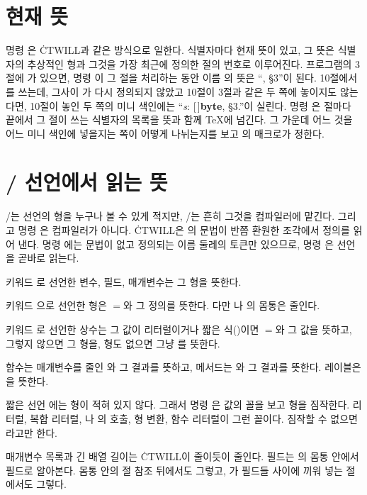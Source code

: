 \section{현재 뜻}
명령 은 \.{CTWILL}과 같은 방식으로 일한다. 식별자마다 현재 뜻이 있고,
그 뜻은 식별자의 추상적인 형과 그것을 가장 최근에 정의한 절의 번호로 이루어진다.
프로그램의 3절에 가 있으면, 명령 이 그 절을 처리하는
동안 이름 의 뜻은 ``, \S3''이 된다. 10절에서 를 쓰는데,
그사이 가 다시 정의되지 않았고 10절이 3절과 같은 두 쪽에 놓이지도 않는다면,
10절이 놓인 두 쪽의 미니 색인에는 ``{\it s\/}: [\,]{\bf byte}, \S3.''이 실린다.
명령 은 절마다 끝에서 그 절이 쓰는 식별자의 목록을 뜻과 함께 \TeX{}에
넘긴다. 그 가운데 어느 것을 어느 미니 색인에 넣을지는 쪽이 어떻게 나뉘는지를 보고
의 매크로가 정한다.

\section{\GO/ 선언에서 읽는 뜻}
\CEE/는 선언의 형을 누구나 볼 수 있게 적지만, \GO/는 흔히 그것을 컴파일러에
맡긴다. 그리고 명령 은 컴파일러가 아니다. \.{CTWILL}은 의
문법이 반쯤 환원한 조각에서 정의를 읽어 낸다. 명령 에는 문법이 없고
정의되는 이름 둘레의 토큰만 있으므로, 명령 은 선언을 곧바로 읽는다.

\bull 키워드 로 선언한 변수, 필드, 매개변수는 그 형을 뜻한다.

\bull 키워드 으로 선언한 형은 $=$와 그 정의를 뜻한다. 다만
나 의 몸통은 줄인다.

\bull 키워드 로 선언한 상수는 그 값이 리터럴이거나 짧은 식()이면 $=$와 그 값을 뜻하고, 그렇지 않으면 그 형을, 형도 없으면 그냥
를 뜻한다.

\bull 함수는 매개변수를 줄인 와 그 결과를 뜻하고, 메서드는
와 그 결과를 뜻한다. 레이블은 을 뜻한다.

\bull 짧은 선언 에는 형이 적혀 있지 않다. 그래서 명령 은
값의 꼴을 보고 형을 짐작한다. 리터럴, 복합 리터럴, 나 의 호출,
형 변환, 함수 리터럴이 그런 꼴이다. 짐작할 수 없으면 라고만 한다.

\noindent 매개변수 목록과 긴 배열 길이는 \.{CTWILL}이 줄이듯이 줄인다. 필드는
의 몸통 안에서 필드로 알아본다. 몸통 안의 절 참조 뒤에서도 그렇고,
가 필드들 사이에 끼워 넣는 절에서도 그렇다.


